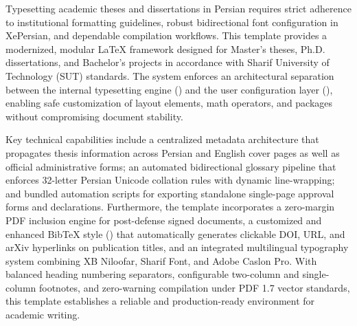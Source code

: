 %
%

\begin{englishabstract}
Typesetting academic theses and dissertations in Persian requires strict adherence to institutional formatting guidelines, robust bidirectional font configuration in XePersian, and dependable compilation workflows. This template provides a modernized, modular LaTeX framework designed for Master's theses, Ph.D. dissertations, and Bachelor's projects in accordance with Sharif University of Technology (SUT) standards. The system enforces an architectural separation between the internal typesetting engine () and the user configuration layer (), enabling safe customization of layout elements, math operators, and packages without compromising document stability.

Key technical capabilities include a centralized metadata architecture that propagates thesis information across Persian and English cover pages as well as official administrative forms; an automated bidirectional glossary pipeline that enforces 32-letter Persian Unicode collation rules with dynamic line-wrapping; and bundled automation scripts for exporting standalone single-page approval forms and declarations. Furthermore, the template incorporates a zero-margin PDF inclusion engine for post-defense signed documents, a customized and enhanced BibTeX style () that automatically generates clickable DOI, URL, and arXiv hyperlinks on publication titles, and an integrated multilingual typography system combining XB Niloofar, Sharif Font, and Adobe Caslon Pro. With balanced heading numbering separators, configurable two-column and single-column footnotes, and zero-warning compilation under PDF 1.7 vector standards, this template establishes a reliable and production-ready environment for academic writing.

\end{englishabstract}

